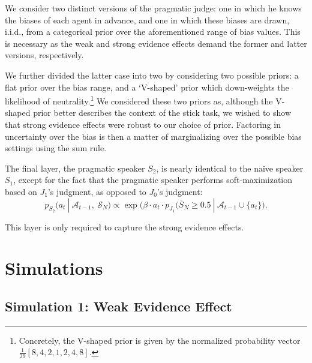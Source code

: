\documentclass[10pt,letterpaper]{article}
\begin{document}
We consider two distinct versions of the pragmatic judge: one in which he knows the biases of each agent in advance, and
one in which these biases are drawn, i.i.d., from a categorical prior over the aforementioned range of bias values. This is 
necessary as the weak and strong evidence effects demand the former and latter versions, respectively. 

We further divided the latter case into two by considering two possible priors: a flat prior over the bias range, and a `V-shaped' prior which down-weights 
the likelihood of neutrality.\footnote{Concretely, the V-shaped prior is given by the normalized probability vector $\frac{1}{29} [8, 4, 2, 1, 2, 4, 8]$.} 
We considered these two priors as, although the V-shaped prior better describes the context of the stick task, we wished to show 
that strong evidence effects were robust to our choice of prior. Factoring in uncertainty over the bias is then a matter of 
marginalizing over the possible bias settings using the sum rule.

The final layer, the pragmatic speaker $S_2$, is nearly identical to the na\"ive speaker $S_1$, except for the fact that
the pragmatic speaker performs soft-maximization based on $J_1$'s judgment, as opposed to $J_0$'s judgment:
\begin{equation}
p_{S_2} (a_t \ | \ \mathcal{A}_{t-1},\ \mathcal{S}_N) \propto \exp \bigl(\beta \cdot a_t \cdot p_{J_1} (\bar{S}_N \ge 0.5 \ | \ \mathcal{A}_{t-1} \cup \{a_t\} \bigr).
\end{equation}

This layer is only required to capture the strong evidence effects.

\section{Simulations}
\subsection{Simulation 1: Weak Evidence Effect}
\end{document}
